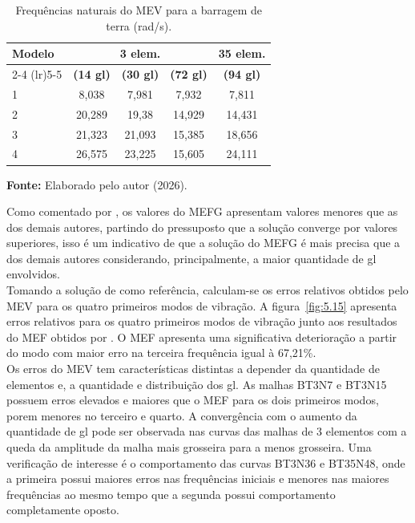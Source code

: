 \begin{table}[htbp]
    \centering
    \caption{Frequências naturais do MEV para a barragem de terra (rad/s).}
    \label{tab:5.9b}
    \small %
    \begin{tabular}{lcccc}
        \toprule
        \multirow{2}{*}{\textbf{Modelo}} & \multicolumn{3}{c}{\textbf{3 elem.}} & \textbf{35 elem.} \\
        \cmidrule(lr){2-4} \cmidrule(lr){5-5}
        & \textbf{(14 gl)} & \textbf{(30 gl)} & \textbf{(72 gl)} & \textbf{(94 gl)} \\
        \midrule
        1 & 8,038  & 7,981  & 7,932  & 7,811  \\
        2 & 20,289 & 19,38  & 14,929 & 14,431 \\
        3 & 21,323 & 21,093 & 15,385 & 18,656 \\
        4 & 26,575 & 23,225 & 15,605 & 24,111 \\
        \bottomrule
    \end{tabular}
    
    \vspace{0.2cm}
    \raggedright
    \textbf{Fonte:} Elaborado pelo autor (2026).
\end{table}

\indent Como comentado por \citet{cittadin2020enriquecimento}, os valores do MEFG apresentam valores menores que as dos demais autores, partindo do pressuposto que a solução converge por valores superiores, isso é um indicativo de que a solução do MEFG é mais precisa que a dos demais autores considerando, principalmente, a maior quantidade de gl envolvidos. \\
\indent Tomando a solução de \citet{cittadin2020enriquecimento} como referência, calculam-se os erros relativos obtidos pelo MEV para os quatro primeiros modos de vibração. A figura~\ref{fig:5.15} apresenta erros relativos para os quatro primeiros modos de vibração junto aos resultados do MEF obtidos por \citet{cittadin2020enriquecimento}. O MEF apresenta uma significativa deterioração a partir do modo com maior erro na terceira frequência igual à 67,21\%. \\
\indent Os erros do MEV tem características distintas a depender da quantidade de elementos e, a quantidade e distribuição dos gl. As malhas BT3N7 e BT3N15 possuem erros elevados e maiores que o MEF para os dois primeiros modos, porem menores no terceiro e quarto. A convergência com o aumento da quantidade de gl pode ser observada nas curvas das malhas de 3 elementos com a queda da amplitude da malha mais grosseira para a menos grosseira. Uma verificação de interesse é o comportamento das curvas BT3N36 e BT35N48, onde a primeira possui maiores erros nas frequências iniciais e menores nas maiores frequências ao mesmo tempo que a segunda possui comportamento completamente oposto.


